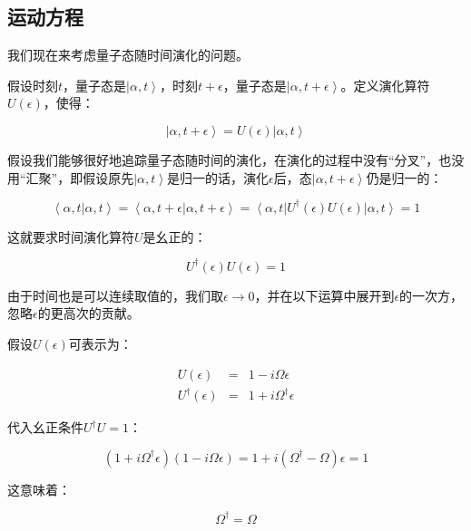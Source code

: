 \subsection{运动方程}

我们现在来考虑量子态随时间演化的问题。

假设时刻$t$，量子态是$\left| \alpha, t \right\rangle$，时刻$t + \epsilon$，量子态是$\left| \alpha, t+\epsilon \right\rangle$。定义演化算符$U(\epsilon)$，使得：

\begin{equation}
\left| \alpha, t + \epsilon \right\rangle = U(\epsilon ) \left| \alpha, t \right\rangle
\end{equation}

假设我们能够很好地追踪量子态随时间的演化，在演化的过程中没有“分叉”，也没用“汇聚”，即假设原先$\left| \alpha, t \right\rangle$是归一的话，演化$\epsilon$后，态$\left| \alpha, t + \epsilon \right\rangle$仍是归一的：

\begin{equation}
\left\langle \alpha, t | \alpha, t \right\rangle =  \left\langle \alpha, t + \epsilon | \alpha, t + \epsilon \right\rangle = \left\langle \alpha, t \right| U^\dagger (\epsilon ) U(\epsilon) \left| \alpha, t \right\rangle = 1 
\end{equation}

这就要求时间演化算符$U$是幺正的：

\begin{equation}
U^\dagger (\epsilon) U (\epsilon) = 1
\end{equation}

由于时间也是可以连续取值的，我们取$\epsilon \to 0$，并在以下运算中展开到$\epsilon$的一次方，忽略$\epsilon$的更高次的贡献。

假设$U(\epsilon) $可表示为：

\begin{eqnarray}
U(\epsilon) &=& 1 - i \Omega \epsilon \\
U^\dagger (\epsilon) &=& 1 + i \Omega^\dagger \epsilon
\end{eqnarray}

代入幺正条件$U^\dagger U =1$：

\begin{equation*}
\left( 1+ i \Omega^\dagger \epsilon \right) \left( 1 - i \Omega \epsilon  \right) = 1 + i \left( \Omega^\dagger - \Omega \right) \epsilon = 1
\end{equation*}

这意味着：

\begin{equation}
\Omega^\dagger = \Omega
\end{equation}


